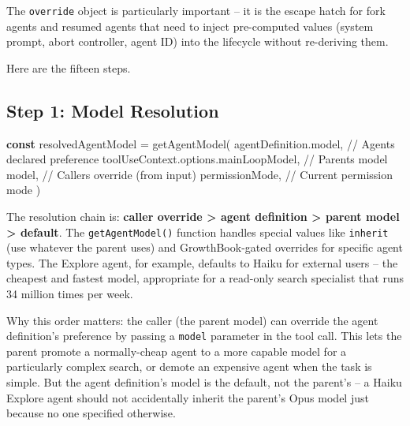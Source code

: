 \documentclass[
  english,
  11pt,
  letterpaper,
]{book}
\newenvironment{Shaded}{\begin{snugshade}}{\end{snugshade}}
\newcommand{\AttributeTok}[1]{\textcolor[rgb]{0.40,0.45,0.13}{#1}}
\newcommand{\CommentTok}[1]{\textcolor[rgb]{0.37,0.37,0.37}{#1}}
\newcommand{\FunctionTok}[1]{\textcolor[rgb]{0.28,0.35,0.67}{#1}}
\newcommand{\KeywordTok}[1]{\textcolor[rgb]{0.00,0.23,0.31}{\textbf{#1}}}
\newcommand{\NormalTok}[1]{\textcolor[rgb]{0.00,0.23,0.31}{#1}}
\newcommand{\OperatorTok}[1]{\textcolor[rgb]{0.37,0.37,0.37}{#1}}
\begin{document}
The \texttt{override} object is particularly important -- it is the
escape hatch for fork agents and resumed agents that need to inject
pre-computed values (system prompt, abort controller, agent ID) into the
lifecycle without re-deriving them.

Here are the fifteen steps.

\subsection{Step 1: Model Resolution}\label{step-1-model-resolution}

\begin{Shaded}
\begin{Highlighting}[]
\KeywordTok{const}\NormalTok{ resolvedAgentModel }\OperatorTok{=} \FunctionTok{getAgentModel}\NormalTok{(}
\NormalTok{  agentDefinition}\OperatorTok{.}\AttributeTok{model}\OperatorTok{,}                    \CommentTok{// Agent\textquotesingle{}s declared preference}
\NormalTok{  toolUseContext}\OperatorTok{.}\AttributeTok{options}\OperatorTok{.}\AttributeTok{mainLoopModel}\OperatorTok{,}      \CommentTok{// Parent\textquotesingle{}s model}
\NormalTok{  model}\OperatorTok{,}                                    \CommentTok{// Caller\textquotesingle{}s override (from input)}
\NormalTok{  permissionMode}\OperatorTok{,}                           \CommentTok{// Current permission mode}
\NormalTok{)}
\end{Highlighting}
\end{Shaded}

The resolution chain is: \textbf{caller override \textgreater{} agent
definition \textgreater{} parent model \textgreater{} default}. The
\texttt{getAgentModel()} function handles special values like
\texttt{\textquotesingle{}inherit\textquotesingle{}} (use whatever the
parent uses) and GrowthBook-gated overrides for specific agent types.
The Explore agent, for example, defaults to Haiku for external users --
the cheapest and fastest model, appropriate for a read-only search
specialist that runs 34 million times per week.

Why this order matters: the caller (the parent model) can override the
agent definition's preference by passing a \texttt{model} parameter in
the tool call. This lets the parent promote a normally-cheap agent to a
more capable model for a particularly complex search, or demote an
expensive agent when the task is simple. But the agent definition's
model is the default, not the parent's -- a Haiku Explore agent should
not accidentally inherit the parent's Opus model just because no one
specified otherwise.
\end{document}
